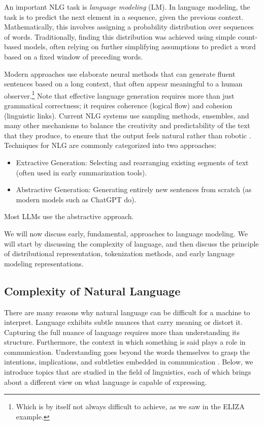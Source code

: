 An important NLG task is \emph{language modeling} (LM). In language modeling, the task is to predict the next element in a sequence, given the previous context. Mathematically, this involves assigning a probability distribution over sequences of words. Traditionally, finding this distribution was achieved using simple count-based models, often relying on further simplifying assumptions to predict a word based on a fixed window of preceding words.

Modern approaches use elaborate neural methods that can generate fluent sentences based on a long context, that often appear meaningful to a human observer.\footnote{Which is by itself not always difficult to achieve, as we saw in the ELIZA example.} Note that effective language generation requires more than just grammatical correctness; it requires coherence (logical flow) and cohesion (linguistic links). Current NLG systems use sampling methods, ensembles, and many other mechanisms to balance the creativity and predictability of the text that they produce, to ensure that the output feels natural rather than robotic \citep{li-jurafsky-2017-neural, 10.1145/3554727, gatt2018survey}. Techniques for NLG are commonly categorized into two approaches:
\begin{itemize}
    \item Extractive Generation: Selecting and rearranging existing segments of text (often used in early summarization tools).
    \item Abstractive Generation: Generating entirely new sentences from scratch (as modern models such as ChatGPT do).
\end{itemize}
Most LLMs use the abstractive approach.

We will now discuss  early, fundamental, approaches to language modeling. We will start by discussing the complexity of language, and then discuss the principle of distributional representation, tokenization methods, and early language modeling representations. 

\subsection{Complexity of Natural Language}
There are many reasons %
why natural language can be difficult for a machine to interpret. Language exhibits subtle nuances that carry meaning or distort it. Capturing the full nuance of language requires more than understanding its structure. Furthermore,  the context in which something is said  plays a role in communication. Understanding goes beyond the words themselves to grasp the intentions, implications, and subtleties embedded in communication \citep{wittgenstein1953philosophical, Grice_1975, krause-vossen-2024-gricean-maxims}. Below, we introduce topics that are studied in the field of linguistics, each of which brings about a different view on what language is capable of expressing. 

